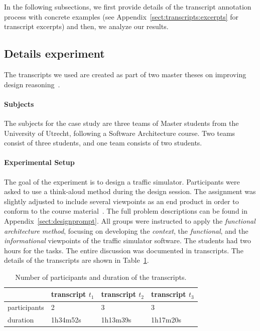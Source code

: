 In the following subsections, we first provide details of the transcript annotation process with concrete examples (see Appendix~\ref{sect:transcripts:excerpts} for transcript excerpts) and then, we analyze our results.

\subsection{Details experiment}

The transcripts we used are created as part of two master theses on improving design reasoning~\cite{masterthesis1,masterthesis2}.

\paragraph{Subjects} The subjects for the case study are three teams of Master students from the University of Utrecht, following a Software Architecture course. Two teams consist of three students, and one team consists of two students.

\paragraph{Experimental Setup} The goal of the experiment is to design a traffic simulator. Participants were asked to use a think-aloud method during the design session. The assignment was slightly adjusted to include several viewpoints as an end product in order to conform to the course material~\cite{Bass:2012:SAP:2392670}. The full problem descriptions can be found in Appendix~\ref{sect:designprompt}. All groups were instructed to apply the \emph{functional architecture method}, focusing on developing the \emph{context}, the \emph{functional}, and the \emph{informational} viewpoints of the traffic simulator software. The students had two hours for the tasks. The entire discussion was documented in transcripts. The details of the transcripts are shown in Table~\ref{table:transcripts:info}.

\begin{table}[ht]
\centering
\begin{tabular}{|l|l|l|l|}
\hline
& transcript $t_1$ & transcript $t_2$ & transcript $t_3$\\
\hline
participants & 2 & 3 & 3\\
\hline
duration & 1h34m52s & 1h13m39s & 1h17m20s\\
\hline
\end{tabular}
\caption{Number of participants and duration of the transcripts.}
\label{table:transcripts:info}
\end{table}

